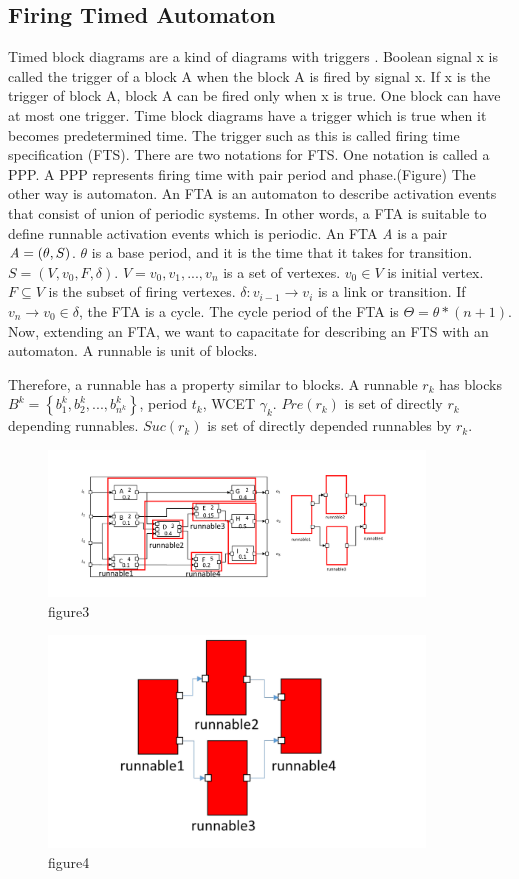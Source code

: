 \documentclass[conference,compsoc]{IEEEtran}
\begin{document}
\subsection{Firing Timed Automaton}
 Timed block diagrams are a kind of diagrams with triggers \cite{Lublinerman:2009:MCG:1480881.1480893}.
Boolean signal x is called the trigger of a block A when the block A is fired by signal x. 
If x is the trigger of block A, block A can be fired only when x is true.
One block can have at most one trigger.
Time block diagrams have a trigger which is true when it becomes predetermined time.
The trigger such as this is called firing time specification (FTS).
There are two notations for FTS.
One notation is called a PPP.
A PPP represents firing time with pair period and phase.(Figure)
The other way is  automaton.
An FTA is an automaton to describe activation events that consist of union of periodic systems.
In other words, a FTA is suitable to define runnable activation events which is periodic.
 An FTA {\it A} is a pair ${\it A} = (\theta,S)$. $\theta$ is a base period, and it is  the time that it takes for transition. 
$S = (V,v_0,F,\delta)$.
$V = {v_0,v_1,...,v_n}$ is a set of vertexes.
$v_0 \in V$ is initial vertex.
$F \subseteq V$ is the subset of firing vertexes.
$\delta : v_{i-1} \rightarrow v_{i}$ is a link or transition.
If $v_n \rightarrow v_0 \in \delta$, the FTA is a cycle.
The cycle period of the FTA is $\Theta = \theta * (n+1)$.
Now, extending an FTA, we want to capacitate for describing an FTS with an automaton.
A runnable is unit of blocks.

Therefore, a runnable has a property similar to blocks.
A runnable $r_k$ has blocks $B^k = \left\{b_1^k,b_2^k,...,b_{n^k}^k\right\}$, period $t_k$, WCET $\gamma_k$.
$Pre(r_k)$ is set of directly $r_k$ depending runnables.
$Suc(r_k)$ is set of directly depended runnables by $r_k$.

\begin{figure}
	\centering
	\includegraphics[width=10cm,clip]{figure7.pdf}
	\caption{figure3}
	\label{fig3}
\end{figure}

\begin{figure}
	\centering
	\includegraphics[width=10cm,clip]{figure8.pdf}
	\caption{figure4}
	\label{fig4}
\end{figure}
\end{document}
